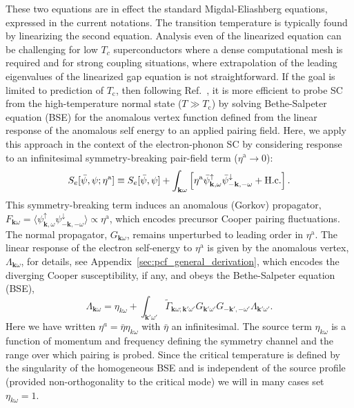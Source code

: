 \documentclass[%
 reprint,
superscriptaddress,
 amsmath,amssymb,
 aps,
prx,
]{revtex4-2}
\newcommand{\bk}{\mathbf{k}}
\newcommand{\Gammapp}{\tilde{\Gamma}}
\newcommand{\txa}{\text{a}}
\newcommand{\txc}{\text{c}}
\begin{document}
These two equations are in effect the standard Migdal-Eliashberg equations, expressed in the current notations. The transition temperature is typically found by linearizing the second equation. Analysis even of the linearized equation can be challenging for low $T_c$ superconductors where a dense computational mesh is required and for strong coupling situations, where extrapolation of the leading eigenvalues of the linearized gap equation is not straightforward. If the goal is limited to prediction of $T_\txc$, then following  Ref.~\cite{pengcheng}, it is more efficient to probe SC from the high-temperature normal state ($T \gg T_\txc$) by solving Bethe-Salpeter equation (BSE) for the anomalous vertex function defined from the linear response of the anomalous self energy to an applied pairing field.  Here, we apply this approach in the context of the electron-phonon SC by considering response to an infinitesimal symmetry-breaking pair-field 
term ($\eta^\txa \to 0$):
\begin{equation}
    S_e[\bar{\psi},\psi; \eta^\txa] \equiv S_e[\bar{\psi}, \psi] + \int_{\bk\omega} \left[\eta^\txa \bar{\psi}^{\uparrow}_{\bk,\omega}\bar{\psi}^{\downarrow}_{-\bk,-\omega} + {\rm H.c.} \right] .
\end{equation}
%
This symmetry-breaking term induces an anomalous (Gorkov) propagator,
$F_{\bk\omega}=\langle {\psi}^{\uparrow}_{\bk,\omega} {\psi}^{\downarrow}_{-\bk,-\omega}\rangle\propto \eta^\txa$,
which encodes precursor Cooper pairing fluctuations. The normal propagator, $G_{\bk\omega}$, remains unperturbed  to leading order in $\eta^\txa$.  
The linear response of the electron self-energy to $\eta^\txa$ is given by the anomalous vertex, $\Lambda_{\bk\omega}$, for details, see Appendix~\ref{sec:pcf_general_derivation}, which 
encodes the diverging Cooper susceptibility, if any, and obeys the Bethe-Salpeter equation (BSE),
\begin{equation}
    \Lambda_{\bk\omega}=\eta_{k\omega} +\int_{\bk'\omega'}\Gammapp_{\bk\omega;\bk'\omega'}G_{\bk'\omega'}G_{-\bk',-\omega'}\Lambda_{\bk'\omega'}.
    \label{eq:lambda_BSE}
\end{equation}
Here we have written $\eta^a=\bar{\eta}\eta_{k\omega}$ with $\bar{\eta}$ an infinitesimal. The source term $\eta_{k\omega}$ is a function of momentum and frequency defining the symmetry channel and the range over which pairing is probed. Since the critical temperature is defined by the singularity of the homogeneous BSE and is independent of the source profile (provided non-orthogonality to the critical mode) we will in many cases set $\eta_{k\omega}=1$.
\end{document}
